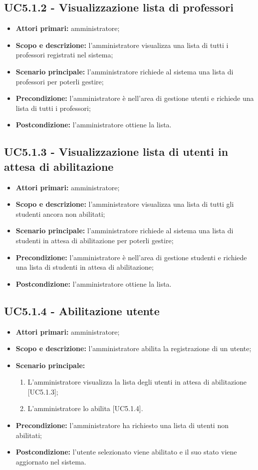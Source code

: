 \documentclass[AnalisiDeiRequisiti.tex]{subfiles}
\begin{document}
\subsection{UC5.1.2 - Visualizzazione lista di professori}
\begin{itemize}
	\item \textbf{Attori primari:} amministratore;
	\item \textbf{Scopo e descrizione:} l'amministratore visualizza una lista di tutti i professori registrati nel sistema;
	\item \textbf{Scenario principale:} l'amministratore richiede al sistema una lista di professori per poterli gestire;
	\item \textbf{Precondizione:} l'amministratore è nell'area di gestione utenti e richiede una lista di tutti i professori; 
	\item \textbf{Postcondizione:} l'amministratore ottiene la lista.
\end{itemize}
\subsection{UC5.1.3 - Visualizzazione lista di utenti in attesa di abilitazione}
\begin{itemize}
	\item \textbf{Attori primari:} amministratore;
	\item \textbf{Scopo e descrizione:} l'amministratore visualizza una lista di tutti gli studenti ancora non abilitati;
	\item \textbf{Scenario principale:} l'amministratore richiede al sistema una lista di studenti in attesa di abilitazione per poterli gestire;
	\item \textbf{Precondizione:} l'amministratore è nell'area di gestione studenti e richiede una lista di studenti in attesa di abilitazione; 
	\item \textbf{Postcondizione:} l'amministratore ottiene la lista.
\end{itemize}
\subsection{UC5.1.4 - Abilitazione utente}
\begin{itemize}
	\item \textbf{Attori primari:} amministratore;
	\item \textbf{Scopo e descrizione:} l'amministratore abilita la registrazione di un utente;
	\item \textbf{Scenario principale:}
	\begin{enumerate}
		\item L'amministratore visualizza la lista degli utenti in attesa di abilitazione [UC5.1.3];
		\item L'amministratore lo abilita [UC5.1.4].
	\end{enumerate}
	\item \textbf{Precondizione:} l'amministratore ha richiesto una lista di utenti non abilitati; 
	\item \textbf{Postcondizione:} l'utente selezionato viene abilitato e il suo stato viene aggiornato nel sistema.
\end{itemize}
\end{document}
